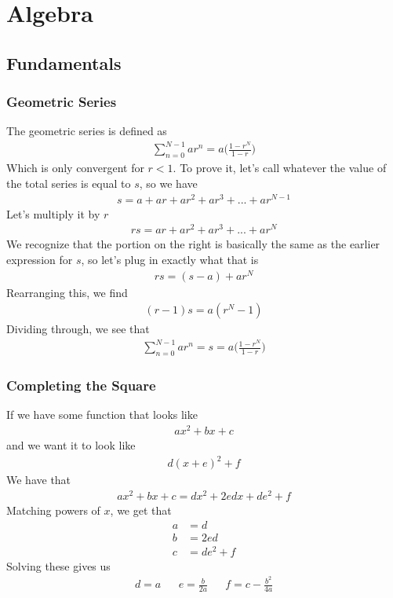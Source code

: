 \chapter{Algebra}

\section{Fundamentals}

\subsection{Geometric Series}
The geometric series is defined as 
\begin{align}
	\sum_{n=0}^{N-1} ar^n =a\Big( \frac{1-r^{N}}{1-r}\Big)
\end{align}
Which is only convergent for $r < 1$. To prove it, let's call whatever the value of the total series is equal to $s$, so we have
\begin{align}
	s = a + ar + ar^2 + ar^3 + ... + ar^{N-1}
\end{align}
Let's multiply it by $r$
\begin{align}
	rs =  ar + ar^2 + ar^3 + ... + ar^{N}
\end{align}
We recognize that the portion on the right is basically the same as the earlier expression for $s$, so let's plug in exactly what that is
\begin{align}
	rs = (s - a) + ar^N
\end{align}
Rearranging this, we find
\begin{align}
	(r-1)s = a(r^N - 1)
\end{align}
Dividing through, we see that
\begin{align}
	\sum_{n=0}^{N-1} ar^n = s = a\Big( \frac{1-r^{N}}{1-r}\Big)
\end{align}


\subsection{Completing the Square}
If we have some function that looks like
\begin{align}
ax^2 + bx + c
\end{align}
and we want it to look like
\begin{align}
d(x+e)^2 + f
\end{align}
We have that 
\begin{align}
ax^2 + bx + c = dx^2 + 2ed x + de^2 + f
\end{align}
Matching powers of $x$, we get that
\begin{align}
a &= d\\
b &= 2ed\\
c &= de^2+f
\end{align}
Solving these gives us
\begin{align}
d = a && e =\frac{b}{2a}  && f = c-\frac{b^2}{4a}
\end{align}


